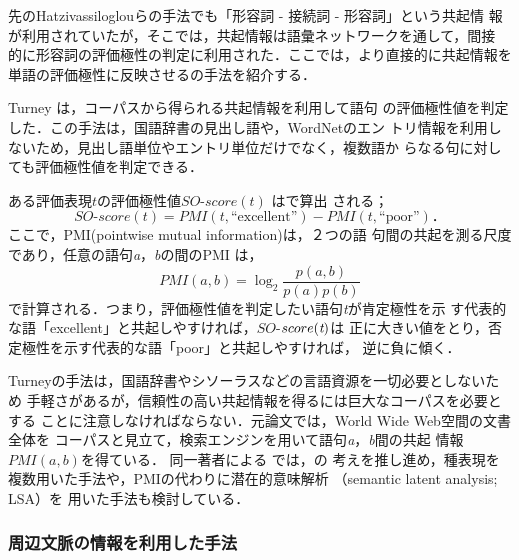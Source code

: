 先のHatzivassiloglouらの手法でも「形容詞 - 接続詞 - 形容詞」という共起情
報が利用されていたが，そこでは，共起情報は語彙ネットワークを通して，間接
的に形容詞の評価極性の判定に利用された．ここでは，より直接的に共起情報を
単語の評価極性に反映させる\cite{turney2002a}の手法を紹介する．

\vspace{1em}
\underline{\textbf{\cite{turney2002a}}}
\vspace{1em}

Turney \cite{turney2002a}は，コーパスから得られる共起情報を利用して語句
の評価極性値を判定した．この手法は，国語辞書の見出し語や，WordNetのエン
トリ情報を利用しないため，見出し語単位やエントリ単位だけでなく，複数語か
らなる句に対しても評価極性値を判定できる．

ある評価表現$\textit{t}$の評価極性値$SO$-$score(t)$ はで算出
される；
\begin{equation}
\label{eq:turney1}
SO\textrm{-}score(\textit{t}) = PMI( \textit{t}, \textrm{``excellent''})
- PMI(\textit{t}, \textrm{``poor''}) ．
\end{equation}
ここで，PMI(pointwise mutual information)\cite{church1989a}は，２つの語
句間の共起を測る尺度であり，任意の語句\textit{a}，\textit{b}の間のPMI は，
\begin{equation}
\label{eq:turney2}
PMI(a, b) = \log _{2}\frac{p(a,b)}{p(a)p(b)}
\end{equation}
で計算される．つまり，評価極性値を判定したい語句\textit{t}が肯定極性を示
す代表的な語「excellent」と共起しやすければ，$SO$-$score({\textit t})$は
正に大きい値をとり，否定極性を示す代表的な語「poor」と共起しやすければ，
逆に負に傾く．

Turneyの手法は，国語辞書やシソーラスなどの言語資源を一切必要としないため
手軽さがあるが，信頼性の高い共起情報を得るには巨大なコーパスを必要とする
ことに注意しなければならない．元論文では，World Wide Web空間の文書全体を
コーパスと見立て，検索エンジンを用いて語句\textit{a}，\textit{b}間の共起
情報$PMI(a, b)$を得ている．
同一著者による \cite{turney2002b,turney2003a}では，\cite{turney2002a}の
考えを推し進め，種表現を複数用いた手法や，PMIの代わりに潜在的意味解析
（semantic latent analysis; LSA）\cite{deerwester1990a,landauer1997a}を
用いた手法も検討している．

\subsubsection{周辺文脈の情報を利用した手法}
\label{sec:bootstrap}


